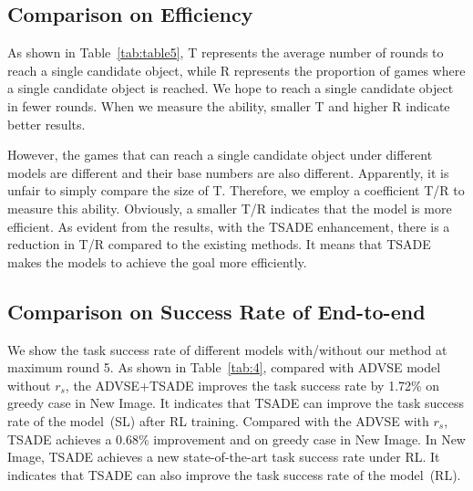 





\subsection{Comparison on Efficiency}

As shown in Table~\ref{tab:table5}, T represents the average number of rounds to reach a single candidate object, while R represents the proportion of games where a single candidate object is reached.
We hope to reach a single candidate object in fewer rounds. When we measure the ability, smaller T and higher R indicate better results. 

However, the games that can reach a single candidate object under different models are different and their base numbers are also different.
Apparently, it is unfair to simply compare the size of T. Therefore, we employ a coefficient T/R to measure this ability. Obviously, a smaller T/R indicates that the model is more efficient.
As evident from the results, with the TSADE enhancement, there is a reduction in T/R compared to the existing methods. It means that TSADE makes the models to achieve the goal more efficiently.






\subsection{Comparison on Success Rate of End-to-end}

We show the task success rate of different models with/without our method at maximum round 5. 
As shown in Table~\ref{tab:4}, compared with ADVSE model without $r_s$, the ADVSE+TSADE improves the task success rate by 1.72\% on greedy case in New Image. 
It indicates that TSADE can improve the task success rate of the model~(SL) after RL training.
Compared with the ADVSE with $r_s$, TSADE achieves a 0.68\% improvement and on greedy case in New Image.
In New Image, TSADE achieves a new state-of-the-art task success rate under RL.
It indicates that TSADE can also improve the task success rate of the model~(RL).

